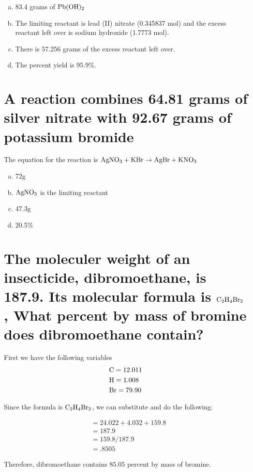 \documentclass{scrartcl}
\begin{document}
\begin{enumerate}[a.]
\item 83.4 grams of \(\ce{Pb(OH)2}\)
\item The limiting reactant is lead (II) nitrate (0.345837 mol) and the excess reactant left over is sodium hydroxide (1.7773 mol).
\item There is 57.256 grams of the excess reactant left over.
\item The percent yield is 95.9\%.
\end{enumerate}

\section{A reaction combines 64.81 grams of silver nitrate with 92.67 grams of potassium bromide}
\label{sec:orgaefd941}
The equation for the reaction is
\(\ce{AgNO3}+\ce{KBr}\rightarrow\ce{AgBr}+\ce{KNO3}\)

\begin{enumerate}[a.]
\item 72g
\item \(\ce{AgNO3}\) is the limiting reactant
\item 47.3g
\item 20.5\%
\end{enumerate}

\section{The moleculer weight of an insecticide, dibromoethane, is 187.9. Its molecular formula is \(\ce{C2H4Br2}\), What percent by mass of bromine does dibromoethane contain?}
\label{sec:org734e936}
First we have the following variables
\begin{align*}
&\ce{C} = 12.011\\
&\ce{H} = 1.008\\
&\ce{Br} = 79.90
\end{align*}

Since the formula is  \(\ce{C2H4Br2}\), we can substitute and do the following:

\begin{align*}
&= 24.022 + 4.032 + 159.8\\
&= 187.9\\
&= 159.8/187.9\\
&=.8505
\end{align*}

Therefore, dibromoethane contains \(85.05\) percent by mass of bromine.
\end{document}
